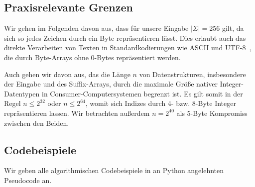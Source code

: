 \subsection{Praxisrelevante Grenzen}

Wir gehen im Folgenden davon aus, dass für unsere Eingabe $|\Sigma| = 256$ gilt, da sich so jedes Zeichen durch ein Byte repräsentieren lässt. Dies erlaubt auch das direkte Verarbeiten von Texten in Standardkodierungen wie ASCII und UTF-8~\cite{grundlagen:utf8}, die durch Byte-Arrays ohne 0-Bytes repräsentiert werden.

Auch gehen wir davon aus, das die Länge $n$ von Datenstrukturen, insbesondere der Eingabe und des Suffix-Arrays, durch die maximale Größe nativer Integer-Datentypen in Consumer-Computersystemen begrenzt ist. Es gilt somit in der Regel $n \leq 2^{32}$ oder $n \leq 2^{64}$, womit sich Indizes durch 4- bzw. 8-Byte Integer repräsentieren lassen. Wir betrachten außerdem $n = 2^{40}$ als 5-Byte Kompromiss zwischen den Beiden.

\subsection{Codebeispiele}

Wir geben alle algorithmischen Codebeispiele in an Python angelehnten Pseudocode an.

